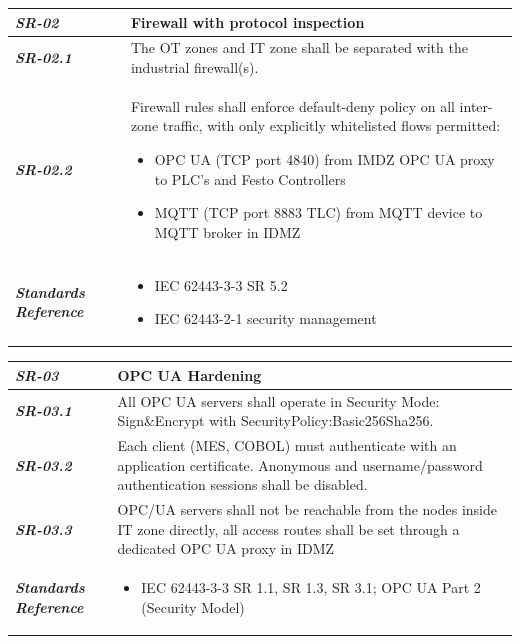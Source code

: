 \documentclass[11pt,a4paper]{article}
\begin{document}
\begin{tabularx}{\textwidth}{>{\bfseries}p{2.5cm} X}
    \textit{SR-02} & \textbf{Firewall with protocol inspection} \vspace{0.5em}\\
\toprule
\textit{SR-02.1} &
    The OT zones and IT zone shall be separated with the industrial firewall(s).
    \vspace{0.5em}
\\
\textit{SR-02.2} &
Firewall rules shall enforce default-deny policy on all inter-zone traffic,
with only explicitly whitelisted flows permitted:
\begin{itemize}[label=-, itemsep=0pt, topsep=2pt]
    \item OPC UA (TCP port 4840) from IMDZ OPC UA proxy to PLC's and Festo Controllers
    \item MQTT (TCP port 8883 TLC) from MQTT device to MQTT broker in IDMZ
\end{itemize} \vspace{1em}
    \\
\midrule
    \textit{Standards Reference} &
\begin{itemize}[label=-, noitemsep, topsep=0pt, leftmargin=*]
    \item IEC 62443-3-3 SR 5.2
    \item IEC 62443-2-1 security management
\end{itemize} \vspace{1em} \\ 
\end{tabularx}
\vspace{2em}

\begin{tabularx}{\textwidth}{>{\bfseries}p{2.5cm} X}
    \textit{SR-03} & \textbf{OPC UA Hardening} \vspace{0.5em}\\
\toprule
\textit{SR-03.1} &
    
    All OPC UA servers shall operate in Security Mode: Sign\&Encrypt with SecurityPolicy:Basic256Sha256.
    \vspace{0.5em}
\\
\textit{SR-03.2} &
    Each client (MES, COBOL) must authenticate with an application certificate. Anonymous and username/password authentication sessions shall be disabled.
    \vspace{0.5em}
    \\
\textit{SR-03.3} &
    OPC/UA servers shall not be reachable from the nodes inside IT zone directly, all access routes shall be set through a dedicated OPC UA proxy in IDMZ
    \vspace{0.5em}
    \\
\midrule
    \textit{Standards Reference} &
\begin{itemize}[label=-, noitemsep, topsep=0pt, leftmargin=*]
    \item IEC 62443-3-3 SR 1.1, SR 1.3, SR 3.1; OPC UA Part 2 (Security Model)
\end{itemize} \vspace{1em} \\ 
\end{tabularx}
\vspace{2em}
\end{document}
